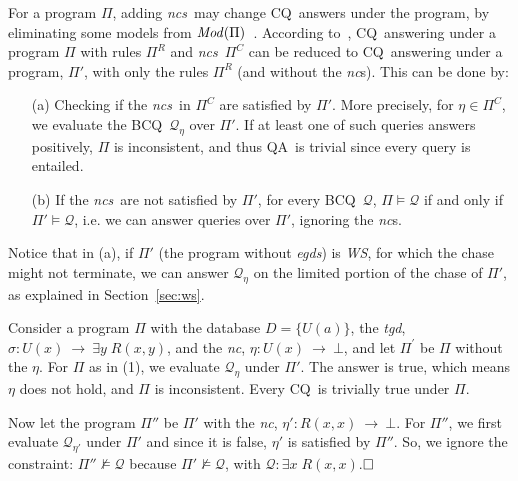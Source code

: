 \documentclass[format=acmsmall, review=false, screen=true]{acmart}
\newcommand{\bcq}{BCQ}
\newcommand{\cq}{CQ}
\newcommand{\boxtheorem}{\ensuremath{\hfill \Box}}
\newcommand{\mc}[1]{\mathcal{ #1}}
\newcommand{\nit}[1]{{\it #1}}
\newcommand{\nc}{{\em nc}}
\newcommand{\dpm}{{Datalog}$^\pm$}
\newcommand{\rules}{\Pi^{R}}
\newcommand{\constraints}{\Pi^{C}}
\newcommand{\prg}{\Pi}
\newcommand{\dplus}{{Datalog}$^+$}
\newcommand{\m}{\;\!\!}
\newcommand{\WS}{{\em W\m{}S}}
\newcommand{\qa}{QA}
\newcommand{\egds}{{\em egds}}
\newcommand{\tgd}{{\em tgd}}
\newcommand{\ncs}{{\em ncs}}
\begin{document}
{%

For a program $\prg$, adding \ncs \ may change \cq \ answers under the program, by eliminating some models from $\nit{Mod}(\prg)$~\cite{cali09}. According to~\cite[Theorem~11]{cali09}, \cq \ answering under a program $\prg$ with rules $\rules$ and \ncs \ $\constraints$ can be reduced to \cq \ answering under a program, $\prg'$, with only the rules $\rules$ (and without the \nc s). This can be done by:

\begin{itemize}
  \item [(a)] Checking if the \ncs \ in $\constraints$ are satisfied by $\prg'$. More precisely, for $\eta \in \constraints$, we evaluate the \bcq \ $\mc{Q}_\eta$ over $\prg'$. If at least one of such queries answers positively, $\prg$ is inconsistent, and thus \qa \ is trivial since every query is entailed.
  \item [(b)] If the \ncs \ are not satisfied by $\prg'$, for every \bcq \ $\mc{Q}$, $\prg \models \mc{Q}$ if and only if $\prg' \models \mc{Q}$, i.e. we can answer queries over $\prg'$, ignoring the \nc s.
\end{itemize}

Notice that in (a), if $\prg'$ (the program without \egds) is \WS, for which the chase might not terminate, we can answer $\mc{Q}_\eta$ on the limited portion of the chase of $\prg'$, as explained in Section~\ref{sec:ws}.

\begin{example} Consider a program $\prg$ with the database $D=\{U(a)\}$, the \tgd, $\sigma:U(x) ~\rightarrow~ \exists y\; R(x,y)$, and the \nc, $\eta: U(x)~\rightarrow~\bot$, and let $\prg^\prime$ be $\prg$ without the $\eta$. For $\prg$ as in (1), we evaluate $\mc{Q}_{\eta}$ under $\prg'$. The answer is true, which means $\eta$ does not hold, and $\prg$ is inconsistent. Every \cq \ is trivially true under $\prg$.

Now let the program $\prg''$ be $\prg'$ with the \nc, $\eta': R(x,x)~\rightarrow~\bot$. For $\prg''$, we first evaluate $\mc{Q}_{\eta'}$ under $\prg'$ and since it is false, $\eta'$ is satisfied by $\prg''$. So, we ignore the constraint: $\prg''\not\models \mc{Q}$ because $\prg' \not\models \mc{Q}$, with $\mc{Q}:\exists x\; R(x,x)$.\boxtheorem \end{example}


}
\end{document}
